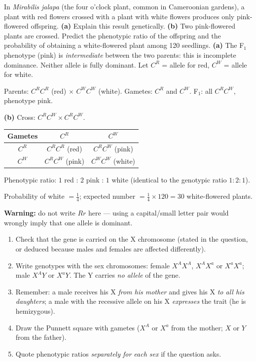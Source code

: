 \documentclass[11pt]{article}
\newcommand{\cle}[1]{{\popxbold\color{popdark}#1}}
\newcounter{popsec}
\newcounter{popsub}
\newcommand{\courssub}[1]{%
  \stepcounter{popsub}%
  \par\vspace{9pt}\noindent{\popxbold\fontsize{11.5}{13}\selectfont\color{popink}{\color{poporange}\thepopsec.\thepopsub}\hspace{6pt}#1}\par\nopagebreak\vspace{4pt}
}
\begin{document}
\begin{exoresolu}
In \emph{Mirabilis jalapa} (the four o'clock plant, common in Cameroonian gardens), a plant with red flowers crossed with a plant with white flowers produces only pink-flowered offspring. \textbf{(a)} Explain this result genetically. \textbf{(b)} Two pink-flowered plants are crossed. Predict the phenotypic ratio of the offspring and the probability of obtaining a white-flowered plant among 120 seedlings.
\tcblower
\textbf{(a)} The F$_1$ phenotype (pink) is \emph{intermediate} between the two parents: this is \cle{incomplete dominance}. Neither allele is fully dominant. Let $C^R$ = allele for red, $C^W$ = allele for white.\par
Parents: $C^R C^R$ (red) $\times$ $C^W C^W$ (white). Gametes: $C^R$ and $C^W$. F$_1$: all $C^R C^W$, phenotype pink.\par
\textbf{(b)} Cross: $C^R C^W \times C^R C^W$.
\begin{center}
\begin{tabular}{|c|c|c|}
\hline
\rowcolor{popblueL} Gametes & $C^R$ & $C^W$ \\
\hline
$C^R$ & $C^R C^R$ (red) & $C^R C^W$ (pink) \\
\hline
$C^W$ & $C^R C^W$ (pink) & $C^W C^W$ (white) \\
\hline
\end{tabular}
\end{center}
Phenotypic ratio: $1$ red : $2$ pink : $1$ white (identical to the genotypic ratio $1:2:1$).\par
Probability of white $= \tfrac{1}{4}$; expected number $= \tfrac{1}{4} \times 120 = 30$ white-flowered plants.\par
\textbf{Warning:} do not write $Rr$ here — using a capital/small letter pair would wrongly imply that one allele is dominant.
\end{exoresolu}

\courssub{Skill 4: Sex-Linked Inheritance}

\begin{methode}
\begin{enumerate}
\item Check that the gene is carried on the \cle{X chromosome} (stated in the question, or deduced because males and females are affected differently).
\item Write genotypes with the sex chromosomes: female $X^A X^A$, $X^A X^a$ or $X^a X^a$; male $X^A Y$ or $X^a Y$. The Y carries \emph{no allele} of the gene.
\item Remember: a male receives his X \emph{from his mother} and gives his X \emph{to all his daughters}; a male with the recessive allele on his X \emph{expresses} the trait (he is \cle{hemizygous}).
\item Draw the Punnett square with gametes ($X^A$ or $X^a$ from the mother; $X$ or $Y$ from the father).
\item Quote phenotypic ratios \emph{separately for each sex} if the question asks.
\end{enumerate}
\end{methode}
\end{document}
